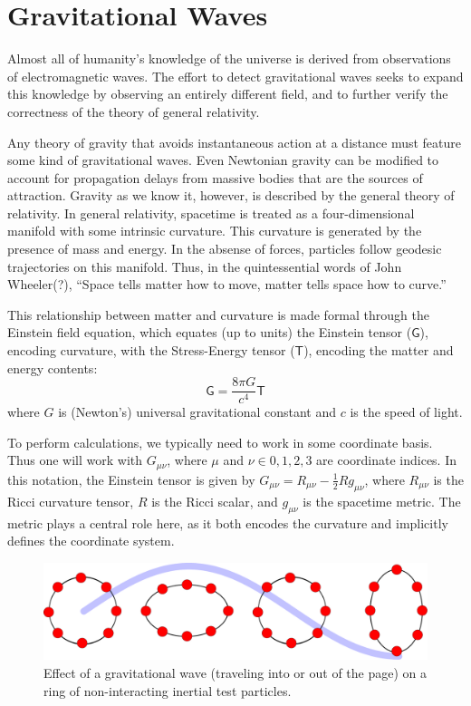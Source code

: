 \label{chapter1}

\section{Gravitational Waves}

Almost all of humanity's knowledge of the universe is derived from
observations of electromagnetic waves.  The effort to detect
gravitational waves seeks to expand this knowledge by observing an
entirely different field, and to further verify the correctness of the
theory of general relativity.

Any theory of gravity that avoids instantaneous action at a distance
must feature some kind of gravitational waves.  Even Newtonian gravity
can be modified to account for propagation delays from massive bodies
that are the sources of attraction\cite{Schutz1984Gravitational}.
Gravity as we know it, however, is described by the general theory of
relativity.  In general relativity, spacetime is treated as a
four-dimensional manifold with some intrinsic curvature.  This
curvature is generated by the presence of mass and energy.  In the
absense of forces, particles follow geodesic trajectories on this
manifold.  Thus, in the quintessential words of John Wheeler(?),
``Space tells matter how to move, matter tells space how to curve.''

This relationship between matter and curvature is made formal through
the Einstein field equation, which equates (up to units) the Einstein
tensor ($\mathsf{G}$), encoding curvature, with the
Stress-Energy tensor ($\mathsf{T}$), encoding the matter and energy
contents:
\begin{equation}
\mathsf{G} = \frac {8\pi G}{c^4} \mathsf{T}
\end{equation}
where $G$ is (Newton's) universal gravitational constant and $c$ is
the speed of light.

To perform calculations, we typically need to work in some coordinate
basis.  Thus one will work with $G_{\mu\nu}$, where $\mu$ and $\nu \in
{0,1,2,3}$ are coordinate indices.  In this notation, the Einstein
tensor is given by $G_{\mu\nu} = R_{\mu\nu} - \frac{1}{2} R
g_{\mu\nu}$, where $R_{\mu\nu}$ is the Ricci curvature tensor, $R$ is
the Ricci scalar, and $g_{\mu\nu}$ is the spacetime metric.  The
metric plays a central role here, as it both encodes the curvature and
implicitly defines the coordinate system.

\begin{figure}
\includegraphics[width=\columnwidth]{chapter1/figures/gwave.pdf}
\caption[Effect of a gravitational wave on a ring of test
  particles]{\label{fig:gwave-effect}Effect of a gravitational wave
  (traveling into or out of the page) on a ring of non-interacting
  inertial test particles.}
\end{figure}

